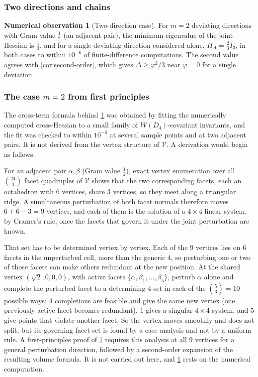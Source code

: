 \documentclass[11pt,reqno]{amsart}
\renewcommand{\_}{\origunderscore\allowbreak}
\numberwithin{equation}{section}
\theoremstyle{plain}
\theoremstyle{definition}
\newtheorem{numobs}[thm]{Numerical observation}
\theoremstyle{remark}
\newcommand{\VCell}{\mathcal{V}}             %
\newcommand{\tilt}{\varphi}                  %
\newcommand{\defect}{\Delta}                 %
\begin{document}
\subsubsection{Two directions and chains}

\begin{numobs}[Two-direction case]\label{lem:m2-exact-new}
For $m=2$ deviating directions with Gram value $\tfrac12$ (an adjacent
pair), the minimum eigenvalue of the joint Hessian is $\tfrac13$, and
for a single deviating direction considered alone, $H_A=\tfrac23I_3$,
in both cases to within $10^{-6}$ of finite-difference computations.
The second value agrees with \cref{cor:second-order}, which gives
$\defect\ge\tilt^2/3$ near $\tilt=0$ for a single deviation.
\end{numobs}

\subsubsection{The case \texorpdfstring{$m=2$}{m=2} from first principles}\label{sec:m2-firstprinciples-new}

The cross-term formula behind \cref{lem:m2-exact-new} was obtained by
fitting the numerically computed cross-Hessian to a small family of
$W(D_4)$-covariant invariants, and the fit was checked to within
$10^{-6}$ at several sample points and at two adjacent pairs. It is not
derived from the vertex structure of $\VCell$. A derivation would begin
as follows.

For an adjacent pair $\alpha,\beta$ (Gram value $\tfrac12$), exact
vertex enumeration over all $\binom{24}{4}$ facet quadruples of $\VCell$
shows that the two corresponding facets, each an octahedron with $6$
vertices, share $3$ vertices, so they meet along a triangular ridge. A
simultaneous perturbation of both facet normals therefore moves $6+6-3=9$
vertices, and each of them is the solution of a $4\times4$ linear
system, by Cramer's rule, once the facets that govern it under the
joint perturbation are known.

That set has to be determined vertex by vertex. Each of the $9$ vertices
lies on $6$ facets in the unperturbed cell, more than the generic $4$,
so perturbing one or two of those facets can make others redundant at
the new position. At the shared vertex $(\sqrt2,0,0,0)$, with active
facets $\{\alpha,\beta_1,\dots,\beta_5\}$, perturb $\alpha$ alone and
complete the perturbed facet to a determining $4$-set in each of the
$\binom53=10$ possible ways: $4$ completions are feasible and give the
same new vertex (one previously active facet becomes redundant), $1$
gives a singular $4\times4$ system, and $5$ give points that violate
another facet. So the vertex moves smoothly and does not split, but its
governing facet set is found by a case analysis and not by a uniform
rule. A first-principles proof of \cref{lem:m2-exact-new} requires this
analysis at all $9$ vertices for a general perturbation direction,
followed by a second-order expansion of the resulting volume formula. It
is not carried out here, and \cref{lem:m2-exact-new} rests on the
numerical computation.
\end{document}
